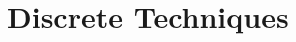 \documentclass[../COS3712_Notes.tex]{subfiles}
\begin{document}
  \setcounter{chapter}{6}
  \chapter{Discrete Techniques}
\end{document}
